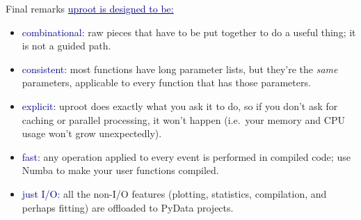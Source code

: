 \documentclass[aspectratio=169]{beamer}
\begin{document}
\begin{frame}{Final remarks}
\vspace{0.35 cm}
\large
\textcolor{darkblue}{\underline{uproot is designed to be:}}

\vspace{0.15 cm}
\begin{itemize}\setlength{\itemsep}{0.25 cm}
\item \textcolor{darkblue}{combinational:} raw pieces that have to be put together to do a useful thing; it is not a guided path.
\item \textcolor{darkblue}{consistent:} most functions have long parameter lists, but they're the {\it same} parameters, applicable to every function that has those parameters.
\item \textcolor{darkblue}{explicit:} uproot does exactly what you ask it to do, so if you don't ask for caching or parallel processing, it won't happen (i.e.\ your memory and CPU usage won't grow unexpectedly).
\item \textcolor{darkblue}{fast:} any operation applied to every event is performed in compiled code; use Numba to make your user functions compiled.
\item \textcolor{darkblue}{just I/O:} all the non-I/O features (plotting, statistics, compilation, and perhaps fitting) are offloaded to PyData projects.
\end{itemize}
\end{frame}
\end{document}
